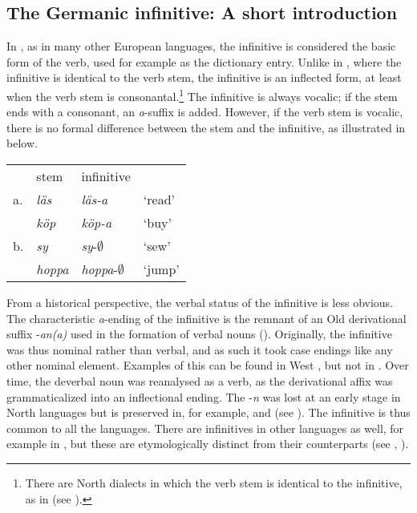 \documentclass[output=paper]{langscibook}
\begin{document}
\subsection{The Germanic infinitive: A short introduction}\label{sec:kalm:3.1}



In , as in many other European languages, the infinitive is considered the basic form of the verb, used for example as the dictionary entry. Unlike in , where the infinitive is identical to the verb stem, the  infinitive is an inflected form, at least when the verb stem is consonantal.\footnote{There are North  dialects in which the verb stem is identical to the infinitive, as in  (see \citealt{Delsing2014Verbsystemet}).}  The  infinitive is always vocalic; if the stem ends with a consonant, an \textit{a}{}-suffix is added. However, if the verb stem is vocalic, there is no formal difference between the stem and the infinitive, as illustrated in  below. 


\ea\label{ex:kalm:2}
\begin{tabular}[t]{llll}
{} & stem & infinitive & {}\\
a. & \textit{läs} & \textit{läs-a} & ‘read’\\
{} & \textit{köp} & \textit{köp-a} & ‘buy’\\	
b. & \textit{sy} & \textit{sy}{}-${\emptyset}$ & ‘sew’\\
{} & \textit{hoppa} & \textit{hoppa}{}-${\emptyset}$ & ‘jump’\\
\end{tabular}
\z

From a historical perspective, the verbal status of the infinitive is less obvious. The characteristic \textit{a}{}-ending of the  infinitive is the remnant of an Old  derivational suffix -\textit{an(a)} used in the formation of verbal nouns (\citealt[193]{FalkTorp1900}). Originally, the infinitive was thus nominal rather than verbal, and as such it took case endings like any other nominal element. Examples of this can be found in West , but not in  \citep[205]{Prokosch1939}. Over time, the deverbal noun was reanalysed as a verb, as the derivational affix was grammaticalized into an inflectional ending. The -\textit{n} was lost at an early stage in North  languages but is preserved in, for example,  and  (see \citealt[636]{Noreen1898}). The infinitive is thus common to all the  languages. There are infinitives in other  languages as well, for example in , but these are etymologically distinct from their  counterparts (see \citealt[205]{Prokosch1939}, \citealt[193]{FalkTorp1900}).
\end{document}
